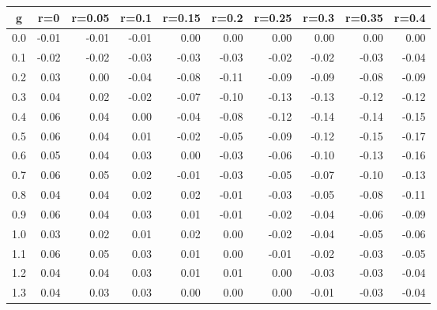 %
\begin{table}[!tbp]
 \begin{center}
 \begin{tabular}{rrrrrrrrrr}\hline\hline
\multicolumn{1}{c}{g}&\multicolumn{1}{c}{r=0}&\multicolumn{1}{c}{r=0.05}&\multicolumn{1}{c}{r=0.1}&\multicolumn{1}{c}{r=0.15}&\multicolumn{1}{c}{r=0.2}&\multicolumn{1}{c}{r=0.25}&\multicolumn{1}{c}{r=0.3}&\multicolumn{1}{c}{r=0.35}&\multicolumn{1}{c}{r=0.4}\tabularnewline
\hline
0.0&-0.01&-0.01&-0.01& 0.00& 0.00& 0.00& 0.00& 0.00& 0.00\tabularnewline
0.1&-0.02&-0.02&-0.03&-0.03&-0.03&-0.02&-0.02&-0.03&-0.04\tabularnewline
0.2& 0.03& 0.00&-0.04&-0.08&-0.11&-0.09&-0.09&-0.08&-0.09\tabularnewline
0.3& 0.04& 0.02&-0.02&-0.07&-0.10&-0.13&-0.13&-0.12&-0.12\tabularnewline
0.4& 0.06& 0.04& 0.00&-0.04&-0.08&-0.12&-0.14&-0.14&-0.15\tabularnewline
0.5& 0.06& 0.04& 0.01&-0.02&-0.05&-0.09&-0.12&-0.15&-0.17\tabularnewline
0.6& 0.05& 0.04& 0.03& 0.00&-0.03&-0.06&-0.10&-0.13&-0.16\tabularnewline
0.7& 0.06& 0.05& 0.02&-0.01&-0.03&-0.05&-0.07&-0.10&-0.13\tabularnewline
0.8& 0.04& 0.04& 0.02& 0.02&-0.01&-0.03&-0.05&-0.08&-0.11\tabularnewline
0.9& 0.06& 0.04& 0.03& 0.01&-0.01&-0.02&-0.04&-0.06&-0.09\tabularnewline
1.0& 0.03& 0.02& 0.01& 0.02& 0.00&-0.02&-0.04&-0.05&-0.06\tabularnewline
1.1& 0.06& 0.05& 0.03& 0.01& 0.00&-0.01&-0.02&-0.03&-0.05\tabularnewline
1.2& 0.04& 0.04& 0.03& 0.01& 0.01& 0.00&-0.03&-0.03&-0.04\tabularnewline
1.3& 0.04& 0.03& 0.03& 0.00& 0.00& 0.00&-0.01&-0.03&-0.04\tabularnewline
\hline
\end{tabular}

\end{center}

\end{table}

